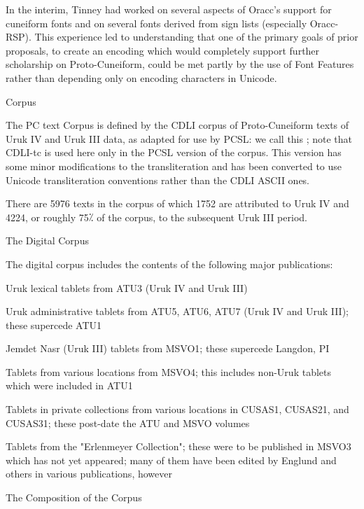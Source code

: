 \par In the interim, Tinney had worked on several aspects of
      Oracc's support for cuneiform fonts and on several fonts derived
      from sign lists (especially Oracc-RSP).  This experience led to
      understanding that one of the primary goals of prior proposals,
      to create an encoding which would completely support further
      scholarship on Proto-Cuneiform, could be met partly by the use
      of Font Features rather than depending only on encoding
      characters in Unicode.

\Hh{}Corpus


\par The PC text Corpus is defined by the CDLI corpus of
      Proto-Cuneiform texts of Uruk IV and Uruk III data, as adapted
      for use by PCSL: we call this ; note that
      CDLI-tc is used here only in the PCSL version of the
      corpus. This version has some minor modifications to the
      transliteration and has been converted to use Unicode
      transliteration conventions rather than the CDLI ASCII ones.


\par There are 5976 texts in the corpus of which 1752 are
      attributed to Uruk IV and 4224, or roughly 75⁒ of the corpus, to
      the subsequent Uruk III period.

\Hhhh{}The Digital Corpus


\par The digital corpus includes the contents of the following major publications:

\Hul\Hli{}Uruk lexical tablets from ATU3 (Uruk IV and Uruk III)

\Hli{}Uruk administrative tablets from ATU5, ATU6, ATU7 (Uruk IV and Uruk III);
	these supercede ATU1

\Hli{}Jemdet Nasr (Uruk III) tablets from MSVO1; these supercede
	Langdon, PI

\Hli{}Tablets from various locations from MSVO4; this includes
	non-Uruk tablets which were included in ATU1

\Hli{}Tablets in private collections from various locations in
	CUSAS1, CUSAS21, and CUSAS31; these post-date the ATU and MSVO
	volumes

\Hli{}Tablets from the "Erlenmeyer Collection"; these were to be
	published in MSVO3 which has not yet appeared; many of them
	have been edited by Englund and others in various
	publications, however

\Hendul
\Hhhh{}The Composition of the Corpus


